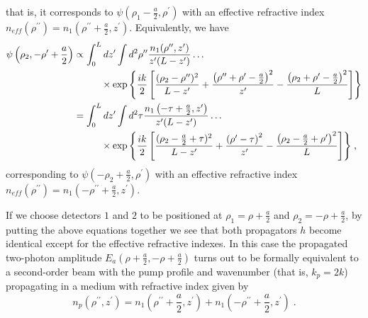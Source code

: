 \documentclass[12pt]{article}
\begin{document}
that is, it corresponds to $\psi\left(\rho_1-\frac{a}{2},\rho^\prime\right)$ with an effective refractive index $n_{eff}(\rho^{\prime\prime})=n_1\left(\rho^{\prime\prime}+\frac{a}{2},z^\prime\right)$. Equivalently, we have
\begin{align}
\psi\left(\rho_2,-\rho^\prime+\frac{a}{2}\right) &\propto \int_0^L dz^\prime \int d^2 \rho^{\prime\prime} \frac{n_1(\rho^{\prime\prime},z^\prime)}{z^\prime (L-z^\prime)} \ldots \notag \\
& \hspace{1cm} \times \exp{\left\{\frac{ik}{2}\left[ \frac{(\rho_2-\rho^{\prime\prime})^2}{L-z^\prime} + \frac{\left(\rho^{\prime\prime}+\rho^\prime-\frac{a}{2}\right)^2}{z^\prime} - \frac{\left(\rho_2 +\rho^\prime -\frac{a}{2}\right)^2}{L}\right]\right\}} \notag \\
&=\int_0^L dz^\prime \int d^2 \tau \frac{n_1\left(-\tau+\frac{a}{2},z^\prime\right)}{z^\prime (L-z^\prime)} \ldots \notag \\
& \hspace{1cm} \times \exp{\left\{\frac{ik}{2}\left[ \frac{(\rho_2- \frac{a}{2}+\tau)^2}{L-z^\prime} + \frac{\left(\rho^\prime-\tau\right)^2}{z^\prime} - \frac{\left(\rho_2 -\frac{a}{2} +\rho^\prime\right)^2}{L}\right]\right\}} \; , 
\end{align}
corresponding to $\psi\left(-\rho_2+\frac{a}{2},\rho^\prime\right)$ with an effective refractive index $n_{eff}(\rho^{\prime\prime})=n_1\left(-\rho^{\prime\prime}+\frac{a}{2},z^\prime\right)$.

If we choose detectors $1$ and $2$ to be positioned at $\rho_1=\rho+\frac{a}{2}$ and $\rho_2=-\rho+\frac{a}{2}$, by putting the above equations together we see that both propagators $h$ become identical except for the effective refractive indexes. In this case the propagated two-photon amplitude $E_a\left(\rho+\frac{a}{2}, -\rho+\frac{a}{2}\right)$ turns out to be formally equivalent to a second-order beam with the pump profile and wavenumber (that is, $k_p=2k$) propagating in a medium with refractive index given by
\begin{equation}
n_p(\rho^{\prime\prime},z^\prime)= n_1\left(\rho^{\prime\prime}+\frac{a}{2}, z^\prime\right) + n_1\left(-\rho^{\prime\prime}+\frac{a}{2},z^\prime\right) \; .
\end{equation}
\end{document}
